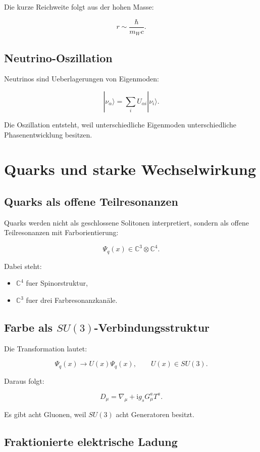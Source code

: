 \documentclass[11pt,a4paper]{article}
\newcommand{\ii}{\mathrm{i}}
\begin{document}
Die kurze Reichweite folgt aus der hohen Masse:

\[
r \sim \frac{\hbar}{m_Wc}.
\]

\subsection{Neutrino-Oszillation}

Neutrinos sind Ueberlagerungen von Eigenmoden:

\[
|\nu_\alpha\rangle = \sum_i U_{\alpha i}|\nu_i\rangle.
\]

Die Oszillation entsteht, weil unterschiedliche Eigenmoden unterschiedliche Phasenentwicklung besitzen.

\section{Quarks und starke Wechselwirkung}

\subsection{Quarks als offene Teilresonanzen}

Quarks werden nicht als geschlossene Solitonen interpretiert, sondern als offene Teilresonanzen mit Farborientierung:

\[
\Psi_q(x)\in \mathbb{C}^3\otimes\mathbb{C}^4.
\]

Dabei steht:
\begin{itemize}
  \item $\mathbb{C}^4$ fuer Spinorstruktur,
  \item $\mathbb{C}^3$ fuer drei Farbresonanzkanäle.
\end{itemize}

\subsection{Farbe als $SU(3)$-Verbindungsstruktur}

Die Transformation lautet:

\[
\Psi_q(x)\rightarrow U(x)\Psi_q(x),
\qquad
U(x)\in SU(3).
\]

Daraus folgt:

\[
D_\mu = \nabla_\mu + \ii g_s G_\mu^aT^a.
\]

Es gibt acht Gluonen, weil $SU(3)$ acht Generatoren besitzt.

\subsection{Fraktionierte elektrische Ladung}
\end{document}
